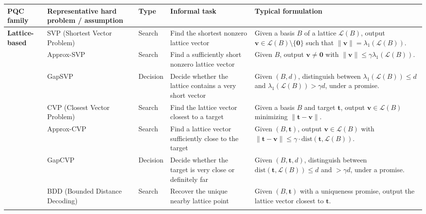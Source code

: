 \documentclass[11pt]{article}
\begin{document}
	\begin{center}
		\scriptsize
		\renewcommand{\arraystretch}{1.35}
		\setlength{\tabcolsep}{4pt}
		\begin{tabular}{|p{2.1cm}|p{3.2cm}|p{1.8cm}|p{3.8cm}|p{5.0cm}|}
			\hline
			\textbf{PQC family} & \textbf{Representative hard problem / assumption} & \textbf{Type} & \textbf{Informal task} & \textbf{Typical formulation} \\
			\hline
			
			\multirow{12}{=}{\textbf{Lattice-based}}
			& SVP (Shortest Vector Problem)
			& Search
			& Find the shortest nonzero lattice vector
			& Given a basis $B$ of a lattice $\mathcal{L}(B)$, output $\bm v \in \mathcal{L}(B)\setminus\{\bm 0\}$ such that $\|\bm v\|=\lambda_1(\mathcal{L}(B))$. \\
			\cline{2-5}
			
			& Approx-SVP
			& Search
			& Find a sufficiently short nonzero lattice vector
			& Given $B$, output $\bm v \neq \bm 0$ with $\|\bm v\| \le \gamma \lambda_1(\mathcal{L}(B))$. \\
			\cline{2-5}
			
			& GapSVP
			& Decision
			& Decide whether the lattice contains a very short vector
			& Given $(B,d)$, distinguish between $\lambda_1(\mathcal{L}(B)) \le d$ and $\lambda_1(\mathcal{L}(B)) > \gamma d$, under a promise. \\
			\cline{2-5}
			
			& CVP (Closest Vector Problem)
			& Search
			& Find the lattice vector closest to a target
			& Given a basis $B$ and target $\bm t$, output $\bm v \in \mathcal{L}(B)$ minimizing $\|\bm t-\bm v\|$. \\
			\cline{2-5}
			
			& Approx-CVP
			& Search
			& Find a lattice vector sufficiently close to the target
			& Given $(B,\bm t)$, output $\bm v \in \mathcal{L}(B)$ with $\|\bm t-\bm v\| \le \gamma \cdot \mathrm{dist}(\bm t,\mathcal{L}(B))$. \\
			\cline{2-5}
			
			& GapCVP
			& Decision
			& Decide whether the target is very close or definitely far
			& Given $(B,\bm t,d)$, distinguish between $\mathrm{dist}(\bm t,\mathcal{L}(B)) \le d$ and $> \gamma d$, under a promise. \\
			\cline{2-5}
			
			& BDD (Bounded Distance Decoding)
			& Search
			& Recover the unique nearby lattice point
			& Given $(B,\bm t)$ with a uniqueness promise, output the lattice vector closest to $\bm t$. \\
			\cline{2-5}
			

\end{tabular}
\end{center}
\end{document}

